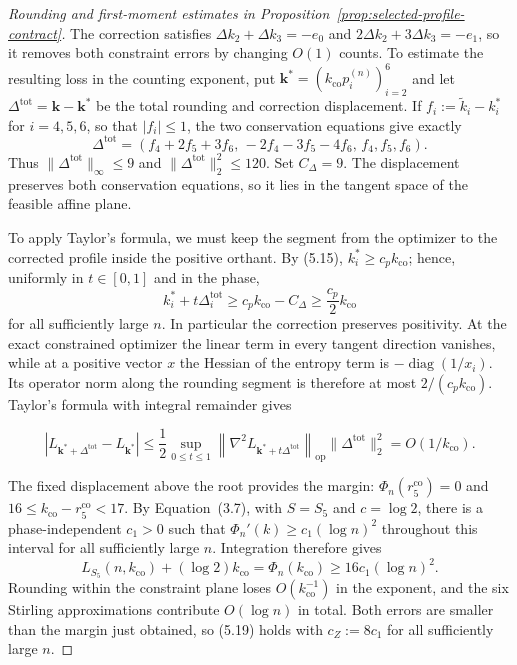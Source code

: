 \documentclass[a4paper,10pt,reqno]{amsart}
\numberwithin{equation}{section}
\theoremstyle{plain}
\theoremstyle{remark}
\begin{document}
\begin{proof}[Rounding and first-moment estimates in Proposition~\ref{prop:selected-profile-contract}]
The correction satisfies \(\Delta k_2+\Delta k_3=-e_0\) and
\(2\Delta k_2+3\Delta k_3=-e_1\), so it removes both constraint errors
by changing \(O(1)\) counts. To estimate the resulting loss in the
counting exponent, put
\(\mathbf k^*=(k_{\mathrm{co}}p_i^{(n)})_{i=2}^6\) and let
\(\Delta^{\mathrm{tot}}=\mathbf k-\mathbf k^*\) be the total rounding
and correction displacement. If $f_i:=\widetilde k_i-k_i^*$ for
$i=4,5,6$, so that $|f_i|\le1$, the two conservation equations give exactly
\[
 \Delta^{\mathrm{tot}}=
 (f_4+2f_5+3f_6,\,-2f_4-3f_5-4f_6,\,f_4,f_5,f_6).
\]
Thus $\|\Delta^{\mathrm{tot}}\|_\infty\le9$ and
$\|\Delta^{\mathrm{tot}}\|_2^2\le120$. Set $C_\Delta=9$.
The displacement preserves both conservation equations, so it lies in the
tangent space of the feasible affine plane.

To apply Taylor's formula, we must keep the segment from the optimizer to
the corrected profile inside the positive orthant. By (5.15),
$k_i^*\ge c_pk_{\mathrm{co}}$; hence, uniformly in $t\in[0,1]$ and in the phase,
\[
  k_i^*+t\Delta_i^{\mathrm{tot}}
  \ge c_pk_{\mathrm{co}}-C_\Delta
  \ge \frac{c_p}{2}k_{\mathrm{co}}
\]
for all sufficiently large $n$. In particular the correction preserves
positivity. At the exact constrained optimizer the linear term in every
tangent direction vanishes, while at a positive vector $x$ the Hessian of the
entropy term is $-\operatorname{diag}(1/x_i)$. Its operator norm along the
rounding segment is therefore at most $2/(c_pk_{\mathrm{co}})$. Taylor's
formula with integral remainder gives

\[
 \left|L_{\mathbf k^*+\Delta^{\mathrm{tot}}}-L_{\mathbf k^*}\right|
 \le \frac12\sup_{0\le t\le1}
 \left\|\nabla^2L_{\mathbf k^*+t\Delta^{\mathrm{tot}}}\right\|_{\mathrm{op}}
 \|\Delta^{\mathrm{tot}}\|_2^2
 =O(1/k_{\mathrm{co}}).
\]

The fixed displacement above the root
provides the margin: $\Phi_n(r_5^{\mathrm{co}})=0$ and
$16\le k_{\mathrm{co}}-r_5^{\mathrm{co}}<17$. By Equation~(3.7), with
$S=S_5$ and $c=\log 2$, there is a phase-independent $c_1>0$ such that
$\Phi_n'(k)\ge c_1(\log n)^2$ throughout this interval for all sufficiently
large $n$.  Integration therefore gives
\[
  L_{S_5}(n,k_{\mathrm{co}})+(\log 2)k_{\mathrm{co}}
  =\Phi_n(k_{\mathrm{co}})
  \ge16c_1(\log n)^2.
\]
Rounding within the constraint plane loses $O(k_{\mathrm{co}}^{-1})$ in the
exponent, and the six Stirling approximations contribute $O(\log n)$ in
total. Both errors are smaller than the margin just obtained, so (5.19)
holds with $c_Z:=8c_1$ for all sufficiently large $n$.
\end{proof}
\end{document}

